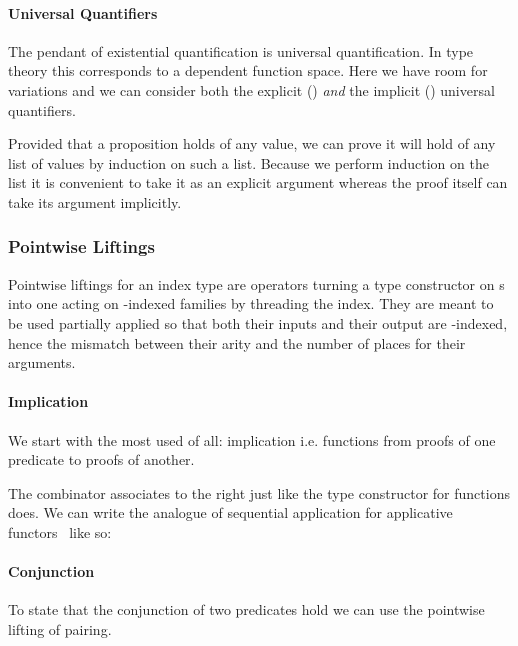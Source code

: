 
\paragraph{Universal Quantifiers} The pendant of existential quantification
is universal quantification. In type theory this corresponds to a dependent
function space. Here we have room for variations and we can consider both
the explicit () \emph{and} the implicit () universal
quantifiers.


Provided that a proposition holds of any value, we can prove it will hold
of any list of values by induction on such a list. Because we perform
induction on the list it is convenient to take it as an explicit argument
whereas the proof itself can take its argument implicitly.


\subsubsection{Pointwise Liftings}

Pointwise liftings for an index type  are operators turning a type
constructor on s into one acting on -indexed families by
threading the index. They are meant to be used partially applied so that
both their inputs and their output are -indexed, hence the mismatch
between their arity and the number of places for their arguments.

\paragraph{Implication} We start with the most used of all: implication
i.e. functions from proofs of one predicate to proofs of another.

The combinator  associates to the right just like the type
constructor for functions does. We can write the analogue of sequential
application for applicative functors~\cite{DBLP:journals/jfp/McbrideP08}
like so:

\paragraph{Conjunction} To state that the conjunction of two predicates hold
we can use the pointwise lifting of pairing.

